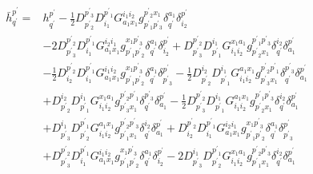 \documentclass[aip,onecolumn,preprint]{revtex4-1}
\begin{document}
\begin{align}
\label{eq:h}
\bar{h}_{q^\prime}^{p^\prime} = 
  &  {{h_{q^\prime}^{p^\prime}}} - {{{\frac{1}{2}}}{D^{{{p^\prime}_3}}_{{{p^\prime}_2}}}{D^{{{p^\prime}_1}}_{{i_1}}}{G^{{i_1}{i_2}}_{{a_1}{x_1}}}{g^{{{p^\prime}_2}{x_1}}_{{{p^\prime}_1}{{p^\prime}_3}}}{\delta^{{a_1}}_{q^\prime}}{\delta^{p^\prime}_{{i_2}}}} \nonumber \\
  & - {{{2}}{D^{{{p^\prime}_2}}_{{{p^\prime}_3}}}{D^{{{p^\prime}_1}}_{{i_1}}}{G^{{i_2}{i_1}}_{{a_1}{x_1}}}{g^{{x_1}{{p^\prime}_3}}_{{{p^\prime}_1}{{p^\prime}_2}}}{\delta^{{a_1}}_{q^\prime}}{\delta^{p^\prime}_{{i_2}}}} + {{D^{{{p^\prime}_2}}_{{{p^\prime}_3}}}{D^{{i_1}}_{{{p^\prime}_1}}}{G^{{x_1}{a_1}}_{{i_1}{i_2}}}{g^{{{p^\prime}_1}{{p^\prime}_3}}_{{{p^\prime}_2}{x_1}}}{\delta^{{i_2}}_{q^\prime}}{\delta^{p^\prime}_{{a_1}}}} \nonumber \\
  & - {{{\frac{1}{2}}}{D^{{{p^\prime}_2}}_{{i_2}}}{D^{{{p^\prime}_1}}_{{i_1}}}{G^{{i_1}{i_2}}_{{a_1}{x_1}}}{g^{{x_1}{{p^\prime}_3}}_{{{p^\prime}_1}{{p^\prime}_2}}}{\delta^{{a_1}}_{q^\prime}}{\delta^{p^\prime}_{{{p^\prime}_3}}}} - {{{\frac{1}{2}}}{D^{{i_2}}_{{{p^\prime}_2}}}{D^{{i_1}}_{{{p^\prime}_1}}}{G^{{a_1}{x_1}}_{{i_1}{i_2}}}{g^{{{p^\prime}_2}{{p^\prime}_1}}_{{{p^\prime}_3}{x_1}}}{\delta^{{{p^\prime}_3}}_{q^\prime}}{\delta^{p^\prime}_{{a_1}}}} \nonumber \\
  & + {{D^{{i_2}}_{{{p^\prime}_2}}}{D^{{i_1}}_{{{p^\prime}_1}}}{G^{{x_1}{a_1}}_{{i_1}{i_2}}}{g^{{{p^\prime}_2}{{p^\prime}_1}}_{{{p^\prime}_3}{x_1}}}{\delta^{{{p^\prime}_3}}_{q^\prime}}{\delta^{p^\prime}_{{a_1}}}} - {{{\frac{1}{2}}}{D^{{{p^\prime}_2}}_{{{p^\prime}_3}}}{D^{{i_1}}_{{{p^\prime}_1}}}{G^{{a_1}{x_1}}_{{i_1}{i_2}}}{g^{{{p^\prime}_1}{{p^\prime}_3}}_{{{p^\prime}_2}{x_1}}}{\delta^{{i_2}}_{q^\prime}}{\delta^{p^\prime}_{{a_1}}}} \nonumber \\
  & + {{D^{{i_1}}_{{{p^\prime}_3}}}{D^{{{p^\prime}_1}}_{{{p^\prime}_2}}}{G^{{a_1}{x_1}}_{{i_1}{i_2}}}{g^{{{p^\prime}_2}{{p^\prime}_3}}_{{{p^\prime}_1}{x_1}}}{\delta^{{i_2}}_{q^\prime}}{\delta^{p^\prime}_{{a_1}}}} + {{D^{{{p^\prime}_2}}_{{i_2}}}{D^{{{p^\prime}_1}}_{{i_1}}}{G^{{i_2}{i_1}}_{{a_1}{x_1}}}{g^{{x_1}{{p^\prime}_3}}_{{{p^\prime}_1}{{p^\prime}_2}}}{\delta^{{a_1}}_{q^\prime}}{\delta^{p^\prime}_{{{p^\prime}_3}}}} \nonumber \\
  & + {{D^{{{p^\prime}_2}}_{{{p^\prime}_3}}}{D^{{{p^\prime}_1}}_{{i_1}}}{G^{{i_1}{i_2}}_{{a_1}{x_1}}}{g^{{x_1}{{p^\prime}_3}}_{{{p^\prime}_1}{{p^\prime}_2}}}{\delta^{{a_1}}_{q^\prime}}{\delta^{p^\prime}_{{i_2}}}} - {{{2}}{D^{{i_1}}_{{{p^\prime}_3}}}{D^{{{p^\prime}_1}}_{{{p^\prime}_2}}}{G^{{x_1}{a_1}}_{{i_1}{i_2}}}{g^{{{p^\prime}_2}{{p^\prime}_3}}_{{{p^\prime}_1}{x_1}}}{\delta^{{i_2}}_{q^\prime}}{\delta^{p^\prime}_{{a_1}}}} \nonumber \\

\end{align}
\end{document}
